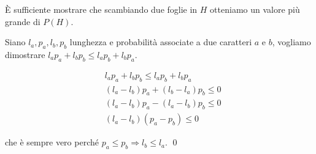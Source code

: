 \begin{proof*}
È sufficiente mostrare che scambiando due foglie in $H$ otteniamo un valore più grande di $P(H)$.

Siano $l_a, p_a, l_b, p_b$ lunghezza e probabilità associate a due caratteri $a$ e $b$, vogliamo
dimostrare $l_a p_a + l_b p_b \le l_a p_b + l_b p_a$.

\begin{align*}
    & l_a p_a + l_b p_b \le l_a p_b + l_b p_a \\
    & (l_a - l_b) p_a + (l_b - l_a) p_b \le 0 \\
    & (l_a - l_b) p_a - (l_a - l_b) p_b \le 0 \\
    & (l_a - l_b)(p_a - p_b) \le 0
\end{align*}

che è sempre vero perché $p_a \le p_b \Rightarrow l_b \le l_a$. \qed
\end{proof*}